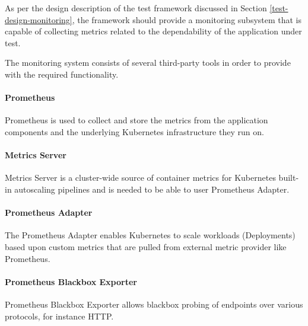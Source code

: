 %	
%	

As per the design description of the test framework discussed in Section \ref{test-design-monitoring}, the framework should provide a monitoring subsystem that is capable of collecting metrics related to the dependability of the application under test.

The monitoring system consists of several third-party tools in order to provide with the required functionality.

\paragraph{Prometheus} Prometheus is used to collect and store the metrics from the application components and the underlying Kubernetes infrastructure they run on.

\paragraph{Metrics Server} Metrics Server is a cluster-wide source of container metrics for Kubernetes built-in autoscaling pipelines and is needed to be able to user Prometheus Adapter.

\paragraph{Prometheus Adapter} The Prometheus Adapter enables Kubernetes to scale workloads (\eg Deployments) based upon custom metrics that are pulled from external metric provider like Prometheus.

\paragraph{Prometheus Blackbox Exporter} Prometheus Blackbox Exporter allows blackbox probing of endpoints over various protocols, for instance HTTP.

